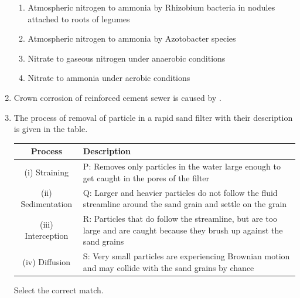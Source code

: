 \documentclass[journal]{IEEEtran}
\numberwithin{equation}{enumi}
\numberwithin{figure}{enumi}
\begin{document}
\begin{enumerate}[start=1, label={Q\arabic*.}]
\begin{enumerate}
  \item Atmospheric nitrogen to ammonia by Rhizobium bacteria in nodules attached to roots of legumes
  \item Atmospheric nitrogen to ammonia by Azotobacter species
  \item Nitrate to gaseous nitrogen under anaerobic conditions
  \item Nitrate to ammonia under aerobic conditions
  \end{enumerate}
\item Crown corrosion of reinforced cement sewer is caused by \underline{\hspace{1.5cm}}.
  \begin{enumerate} 
  \end{enumerate}
\newpage
\item The process of removal of particle in a rapid sand filter with their description is given in the table.
\begin{table}[H]
\centering
\begin{tabular}{|c|p{9cm}|}
\hline
\textbf{Process} & \textbf{Description} \\
\hline
(i) Straining & P: Removes only particles in the water large enough to get caught in the pores of the filter \\
\hline
(ii) Sedimentation & Q: Larger and heavier particles do not follow the fluid streamline around the sand grain and settle on the grain \\
\hline
(iii) Interception & R: Particles that do follow the streamline, but are too large and are caught because they brush up against the sand grains \\
\hline
(iv) Diffusion & S: Very small particles are experiencing Brownian motion and may collide with the sand grains by chance \\
\hline
\end{tabular}
\end{table}
Select the correct match.
\begin{enumerate} 
  \begin{multicols}{2}

\end{multicols}
\end{enumerate}
\end{enumerate}
\end{document}
